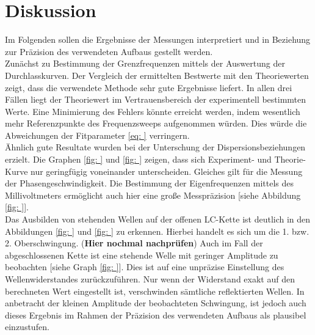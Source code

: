 \section{Diskussion}
Im Folgenden sollen die Ergebnisse der Messungen interpretiert und in Beziehung zur Präzision des verwendeten Aufbaus gestellt werden. \\
Zunächst zu Bestimmung der Grenzfrequenzen mittels der Auswertung der Durchlasskurven. Der Vergleich
der ermittelten Bestwerte mit den Theoriewerten zeigt, dass die verwendete Methode sehr gute Ergebnisse liefert.
In allen drei Fällen liegt der Theoriewert im Vertrauensbereich der experimentell bestimmten Werte. Eine Minimierung
des Fehlers könnte erreicht werden, indem wesentlich mehr Referenzpunkte des Frequenzsweeps aufgenommen würden. Dies würde
die Abweichungen der Fitparameter \eqref{eq: } verringern. \\
Ähnlich gute Resultate wurden bei der Unterschung der Dispersionsbeziehungen erzielt. Die Graphen \ref{fig: } und \ref{fig: }
zeigen, dass sich Experiment- und Theorie-Kurve nur geringfügig voneinander unterscheiden. Gleiches gilt
für die Messung der Phasengeschwindigkeit. Die Bestimmung der Eigenfrequenzen mittels des Millivoltmeters ermöglicht
auch hier eine große Messpräzision [siehe Abbildung \ref{fig: }].\\
Das Ausbilden von stehenden Wellen auf der offenen LC-Kette ist deutlich in den Abbildungen \ref{fig: } und \ref{fig: }
zu erkennen. Hierbei handelt es sich um die 1. bzw. 2. Oberschwingung. (\textbf{Hier nochmal nachprüfen}) Auch im Fall
der abgeschlossenen Kette ist eine stehende Welle mit geringer Amplitude zu beobachten [siehe Graph \ref{fig: }]. Dies
ist auf eine unpräzise Einstellung des Wellenwiderstandes zurückzuführen. Nur wenn der Widerstand exakt auf den berechneten
Wert eingestellt ist, verschwinden sämtliche reflektierten Wellen. In anbetracht der kleinen Amplitude der beobachteten
Schwingung, ist jedoch auch dieses Ergebnis im Rahmen der Präzision des verwendeten Aufbaus als plausibel einzustufen.

